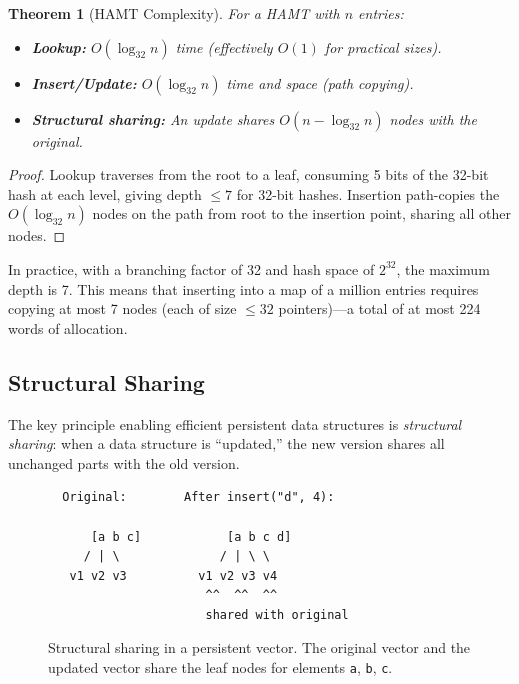 \documentclass[11pt]{article}
\newtheorem{theorem}{Theorem}[section]
\theoremstyle{definition}
\theoremstyle{remark}
\begin{document}
\begin{theorem}[HAMT Complexity]
\label{thm:hamt-complexity}
For a HAMT with $n$ entries:
\begin{itemize}
  \item \textbf{Lookup:} $O(\log_{32} n)$ time (effectively $O(1)$
    for practical sizes).
  \item \textbf{Insert/Update:} $O(\log_{32} n)$ time and space
    (path copying).
  \item \textbf{Structural sharing:} An update shares
    $O(n - \log_{32} n)$ nodes with the original.
\end{itemize}
\end{theorem}

\begin{proof}
Lookup traverses from the root to a leaf, consuming 5 bits of the
32-bit hash at each level, giving depth $\leq 7$ for 32-bit hashes.
Insertion path-copies the $O(\log_{32} n)$ nodes on the path from
root to the insertion point, sharing all other nodes.
\end{proof}

In practice, with a branching factor of 32 and hash space of
$2^{32}$, the maximum depth is 7.  This means that inserting into a
map of a million entries requires copying at most 7 nodes (each of
size $\leq 32$ pointers)---a total of at most 224 words of allocation.

\subsection{Structural Sharing}
\label{sec:implementation:sharing}

The key principle enabling efficient persistent data structures is
\emph{structural sharing}: when a data structure is ``updated,'' the
new version shares all unchanged parts with the old version.

\begin{figure}[h]
\centering
\begin{verbatim}
  Original:        After insert("d", 4):

      [a b c]            [a b c d]
     / | \              / | \ \
   v1 v2 v3          v1 v2 v3 v4
                      ^^  ^^  ^^
                      shared with original
\end{verbatim}
\caption{Structural sharing in a persistent vector.  The original
  vector and the updated vector share the leaf nodes for elements
  \texttt{a}, \texttt{b}, \texttt{c}.}
\label{fig:structural-sharing}
\end{figure}
\end{document}
